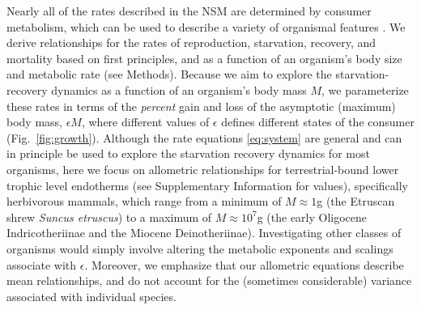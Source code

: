\documentclass[twocolumn,preprintnumbers,amsmath,amssymb,superscriptaddress]{revtex4}
\begin{document}
\begin{bibunit}[unsrt]
Nearly all of the rates described in the NSM are determined by consumer
metabolism, which can be used to describe a variety of organismal features
\citep{Brown:2004wq}.
We derive relationships for the rates of reproduction, starvation, recovery, and mortality based on first principles, and as a function of an organism's body size and metabolic rate (see Methods).
Because we aim to explore the starvation-recovery dynamics as a function of an organism's body mass $M$, we parameterize these rates in terms of the \emph{percent} gain and loss of the asymptotic (maximum) body mass, $\epsilon M$, where different values of $\epsilon$ defines different states of the consumer (Fig.~\ref{fig:growth}).
Although the rate equations \eqref{eq:system} are general and can in principle be used to explore the starvation recovery dynamics for most organisms, here we focus on allometric relationships for terrestrial-bound lower trophic level endotherms (see Supplementary Information for values), specifically herbivorous mammals, which range from a minimum of $M\approx1$g (the Etruscan shrew \emph{Suncus etruscus}) to a maximum of $M\approx10^7$g (the early Oligocene Indricotheriinae and the Miocene Deinotheriinae).
Investigating other classes of organisms would simply involve altering the metabolic exponents and scalings associate with $\epsilon$. Moreover, we emphasize that our allometric equations describe mean relationships, and do not account for the (sometimes considerable) variance associated with individual species.\\




\end{bibunit}
\end{document}
